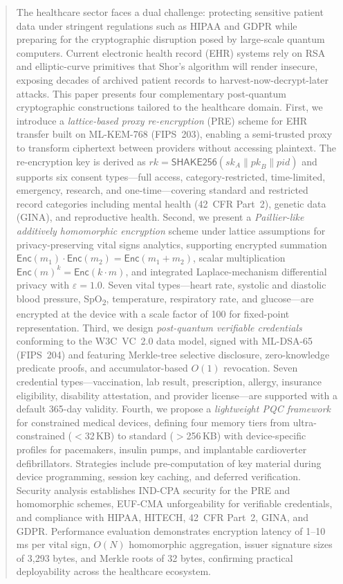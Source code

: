 \documentclass[conference,10pt]{IEEEtran}
\newcommand{\mlkem}{\textsf{ML-KEM}}
\newcommand{\mldsa}{\textsf{ML-DSA}}
\newcommand{\shake}{\textsf{SHAKE256}}
\newcommand{\Enc}{\mathsf{Enc}}
\begin{document}
\begin{abstract}
The healthcare sector faces a dual challenge: protecting sensitive patient data under stringent regulations such as HIPAA and GDPR while preparing for the cryptographic disruption posed by large-scale quantum computers. Current electronic health record (EHR) systems rely on RSA and elliptic-curve primitives that Shor's algorithm will render insecure, exposing decades of archived patient records to harvest-now-decrypt-later attacks. This paper presents four complementary post-quantum cryptographic constructions tailored to the healthcare domain. First, we introduce a \emph{lattice-based proxy re-encryption} (PRE) scheme for EHR transfer built on \mlkem{}-768 (FIPS~203), enabling a semi-trusted proxy to transform ciphertext between providers without accessing plaintext. The re-encryption key is derived as $\mathit{rk} = \shake{}(\mathit{sk}_A \| \mathit{pk}_B \| \mathit{pid})$ and supports six consent types---full access, category-restricted, time-limited, emergency, research, and one-time---covering standard and restricted record categories including mental health (42~CFR Part~2), genetic data (GINA), and reproductive health. Second, we present a \emph{Paillier-like additively homomorphic encryption} scheme under lattice assumptions for privacy-preserving vital signs analytics, supporting encrypted summation $\Enc(m_1) \cdot \Enc(m_2) = \Enc(m_1 + m_2)$, scalar multiplication $\Enc(m)^k = \Enc(k \cdot m)$, and integrated Laplace-mechanism differential privacy with $\varepsilon = 1.0$. Seven vital types---heart rate, systolic and diastolic blood pressure, SpO\textsubscript{2}, temperature, respiratory rate, and glucose---are encrypted at the device with a scale factor of 100 for fixed-point representation. Third, we design \emph{post-quantum verifiable credentials} conforming to the W3C~VC~2.0 data model, signed with \mldsa{}-65 (FIPS~204) and featuring Merkle-tree selective disclosure, zero-knowledge predicate proofs, and accumulator-based $O(1)$ revocation. Seven credential types---vaccination, lab result, prescription, allergy, insurance eligibility, disability attestation, and provider license---are supported with a default 365-day validity. Fourth, we propose a \emph{lightweight PQC framework} for constrained medical devices, defining four memory tiers from ultra-constrained ($<$32\,KB) to standard ($>$256\,KB) with device-specific profiles for pacemakers, insulin pumps, and implantable cardioverter defibrillators. Strategies include pre-computation of key material during device programming, session key caching, and deferred verification. Security analysis establishes IND-CPA security for the PRE and homomorphic schemes, EUF-CMA unforgeability for verifiable credentials, and compliance with HIPAA, HITECH, 42~CFR Part~2, GINA, and GDPR. Performance evaluation demonstrates encryption latency of 1--10\,ms per vital sign, $O(N)$ homomorphic aggregation, issuer signature sizes of 3{,}293 bytes, and Merkle roots of 32 bytes, confirming practical deployability across the healthcare ecosystem.
\end{abstract}
\end{document}
